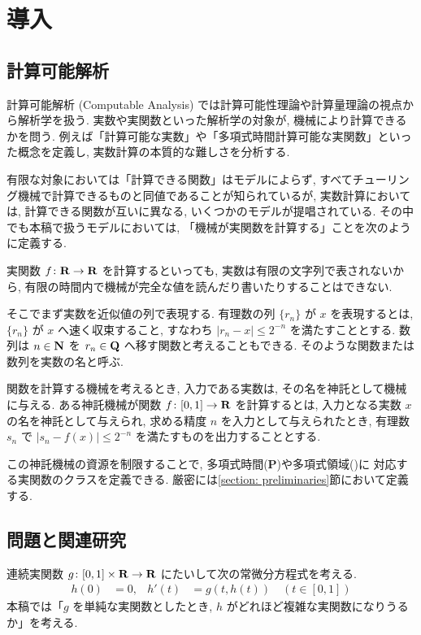 \section{導入}

\subsection{計算可能解析}

計算可能解析 (Computable Analysis) では計算可能性理論や計算量理論の視点から解析学を扱う. 
実数や実関数といった解析学の対象が, 機械により計算できるかを問う. 
例えば「計算可能な実数」や「多項式時間計算可能な実関数」といった概念を定義し, 
実数計算の本質的な難しさを分析する.

有限な対象においては「計算できる関数」はモデルによらず,
すべてチューリング機械で計算できるものと同値であることが知られているが,
実数計算においては, 計算できる関数が互いに異なる, いくつかのモデルが提唱されている.
その中でも本稿で扱うモデルにおいては,
「機械が実関数を計算する」ことを次のように定義する.

実関数 $f \colon \mathbf R \to \mathbf R$ を計算するといっても,
実数は有限の文字列で表されないから, 
有限の時間内で機械が完全な値を読んだり書いたりすることはできない.

そこでまず実数を近似値の列で表現する.
有理数の列 $\{r_n\}$ が $x$ を表現するとは,
$\{r_n\}$ が $x$ へ速く収束すること, 
すなわち $|r_n - x| \le 2^{-n}$ を満たすこととする.
数列は $n \in \mathbf N$ を $r_n \in \mathbf Q$ へ移す関数と考えることもできる.
そのような関数または数列を実数の名と呼ぶ.

関数を計算する機械を考えるとき,
入力である実数は, その名を神託として機械に与える.
ある神託機械が関数 $f \colon [0, 1] \to \mathbf R$ を計算するとは,
入力となる実数 $x$ の名を神託として与えられ,
求める精度 $n$ を入力として与えられたとき,
有理数 $s_n$ で $|s_n - f(x)| \le 2^{-n}$ を満たすものを出力することとする.

この神託機械の資源を制限することで, 多項式時間({\bf P})や多項式領域(\PSPACE)に
対応する実関数のクラスを定義できる.
厳密には\ref{section: preliminaries}節において定義する.

\subsection{問題と関連研究}

連続実関数 $g \colon [0,1] \times \mathbf R \to \mathbf R$ にたいして次の常微分方程式を考える. 
\begin{align}
 \label{eq:ode}
 h(0) & = 0, &
 h'(t) & = g(t,h(t)) \quad (t \in [0,1])
\end{align}
本稿では「$g$ を単純な実関数としたとき, 
$h$ がどれほど複雑な実関数になりうるか」を考える.


